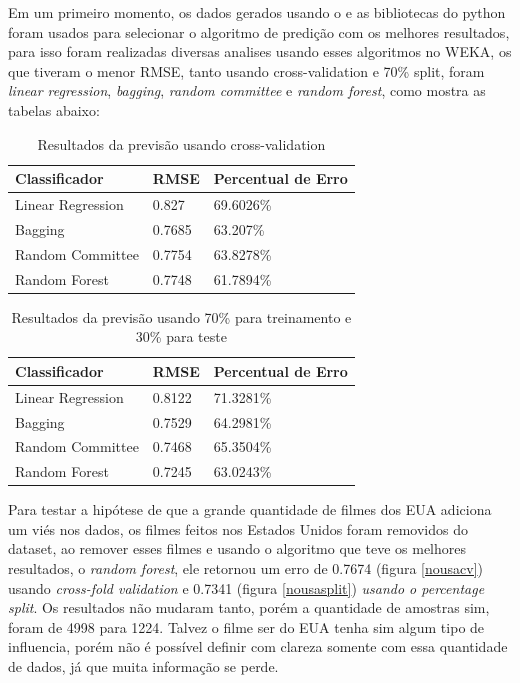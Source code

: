 Em um primeiro momento, os dados gerados usando o \pdi e as bibliotecas do python foram usados para selecionar o algoritmo de predição com os melhores resultados, para isso foram realizadas diversas analises usando esses algoritmos no WEKA, os que tiveram o menor RMSE, tanto usando cross-validation e 70\% split, foram \textit{linear regression}, \textit{bagging}, \textit{random committee} e \textit{random forest}, como mostra as tabelas abaixo:

\begin{longtable}{|l|l|l|}
\caption{Resultados da previsão usando cross-validation}
\label{cvfull}
\\ \hline
\textbf{Classificador} & \textbf{RMSE} & \textbf{Percentual de Erro} \\ \hline
Linear Regression      & 0.827         & 69.6026\%                   \\ \hline
Bagging                & 0.7685        & 63.207\%                    \\ \hline
Random Committee       & 0.7754        & 63.8278\%                     \\ \hline
Random Forest          & 0.7748        & 61.7894\%                     \\ \hline
\end{longtable}


\begin{longtable}{|l|l|l|}
\caption{Resultados da previsão usando 70\% para treinamento e 30\% para teste}
\label{splitfull}
\\\hline
\textbf{Classificador} & \textbf{RMSE} & \textbf{Percentual de Erro} \\ \hline
Linear Regression      & 0.8122        & 71.3281\%                   \\ \hline
Bagging                & 0.7529        & 64.2981\%                   \\ \hline
Random Committee       & 0.7468        & 65.3504\%                   \\ \hline
Random Forest          & 0.7245        & 63.0243\%                   \\ \hline
\end{longtable}



Para testar a hipótese de que a grande quantidade de filmes dos EUA adiciona um viés nos dados, os filmes feitos nos Estados Unidos foram removidos do dataset, ao remover esses filmes e usando o algoritmo que teve os melhores resultados, o \textit{random forest}, ele retornou um erro de 0.7674 (figura \ref{nousacv}) usando \textit{cross-fold validation} e 0.7341 (figura \ref{nousasplit}) \textit{usando o percentage split}. Os resultados não mudaram tanto, porém a quantidade de amostras sim, foram de 4998 para 1224. Talvez o filme ser do EUA tenha sim algum tipo de influencia, porém não é possível definir com clareza somente com essa quantidade de dados, já que muita informação se perde.

